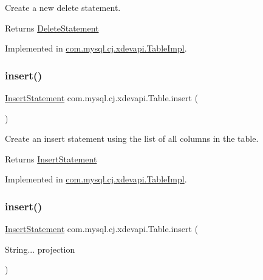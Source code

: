 Create a new delete statement.

\begin{DoxyReturn}{Returns}
\mbox{\hyperlink{interfacecom_1_1mysql_1_1cj_1_1xdevapi_1_1_delete_statement}{Delete\+Statement}} 
\end{DoxyReturn}


Implemented in \mbox{\hyperlink{classcom_1_1mysql_1_1cj_1_1xdevapi_1_1_table_impl_ab12665d608984e6774957947f6a22c7c}{com.\+mysql.\+cj.\+xdevapi.\+Table\+Impl}}.

\mbox{\label{interfacecom_1_1mysql_1_1cj_1_1xdevapi_1_1_table_ae9faedd85539146509fa68982fc346f9}} 
\subsubsection{\texorpdfstring{insert()}{insert()}\hspace{0.1cm}{\footnotesize\ttfamily [1/3]}}
{\footnotesize\ttfamily \mbox{\hyperlink{interfacecom_1_1mysql_1_1cj_1_1xdevapi_1_1_insert_statement}{Insert\+Statement}} com.\+mysql.\+cj.\+xdevapi.\+Table.\+insert (\begin{DoxyParamCaption}{ }\end{DoxyParamCaption})}

Create an insert statement using the list of all columns in the table.

\begin{DoxyReturn}{Returns}
\mbox{\hyperlink{interfacecom_1_1mysql_1_1cj_1_1xdevapi_1_1_insert_statement}{Insert\+Statement}} 
\end{DoxyReturn}


Implemented in \mbox{\hyperlink{classcom_1_1mysql_1_1cj_1_1xdevapi_1_1_table_impl_a1da24c004f76d313383111cb4f250a3c}{com.\+mysql.\+cj.\+xdevapi.\+Table\+Impl}}.

\mbox{\label{interfacecom_1_1mysql_1_1cj_1_1xdevapi_1_1_table_a67eccc4ea9487430c524001bdd912180}} 
\subsubsection{\texorpdfstring{insert()}{insert()}\hspace{0.1cm}{\footnotesize\ttfamily [2/3]}}
{\footnotesize\ttfamily \mbox{\hyperlink{interfacecom_1_1mysql_1_1cj_1_1xdevapi_1_1_insert_statement}{Insert\+Statement}} com.\+mysql.\+cj.\+xdevapi.\+Table.\+insert (\begin{DoxyParamCaption}\item[{String...}]{projection }\end{DoxyParamCaption})}

